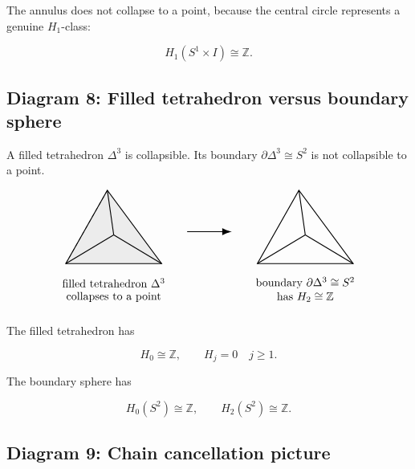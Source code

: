 \documentclass[12pt,a4paper]{article}
\theoremstyle{notespace}
\begin{document}
The annulus does not collapse to a point, because the central circle represents a genuine \(H_1\)-class:

\[
H_1(S^1\times I)\cong \mathbb Z.
\]

\subsection{Diagram 8: Filled tetrahedron versus boundary sphere}

A filled tetrahedron \(\Delta^3\) is collapsible. Its boundary \(\partial\Delta^3\cong S^2\) is not collapsible to a point.

\[
\begin{tikzpicture}[scale=1.0]
	\coordinate (A) at (0,0);
	\coordinate (B) at (3,0);
	\coordinate (C) at (1.3,2.3);
	\coordinate (D) at (1.5,0.9);
	
	\fill[gray!15] (A)--(B)--(C)--cycle;
	\draw[thick] (A)--(B)--(C)--cycle;
	\draw[thick] (A)--(D);
	\draw[thick] (B)--(D);
	\draw[thick] (C)--(D);
	\draw[dashed] (A)--(C);
	
	\node at (1.5,-0.6) {filled tetrahedron \(\Delta^3\)};
	\node at (1.5,-1.05) {collapses to a point};
	
	\draw[-{Latex[length=3mm]},thick] (3.8,1)--(5.2,1);
	
	\begin{scope}[xshift=6cm]
		\coordinate (A) at (0,0);
		\coordinate (B) at (3,0);
		\coordinate (C) at (1.3,2.3);
		\coordinate (D) at (1.5,0.9);
		
		\draw[thick] (A)--(B)--(C)--cycle;
		\draw[thick] (A)--(D);
		\draw[thick] (B)--(D);
		\draw[thick] (C)--(D);
		
		\node at (1.5,-0.6) {boundary \(\partial\Delta^3\cong S^2\)};
		\node at (1.5,-1.05) {has \(H_2\cong\mathbb Z\)};
	\end{scope}
\end{tikzpicture}
\]

The filled tetrahedron has

\[
H_0\cong \mathbb Z,
\qquad
H_j=0
\quad
j\geq 1.
\]

The boundary sphere has

\[
H_0(S^2)\cong \mathbb Z,
\qquad
H_2(S^2)\cong \mathbb Z.
\]

\subsection{Diagram 9: Chain cancellation picture}
\end{document}
